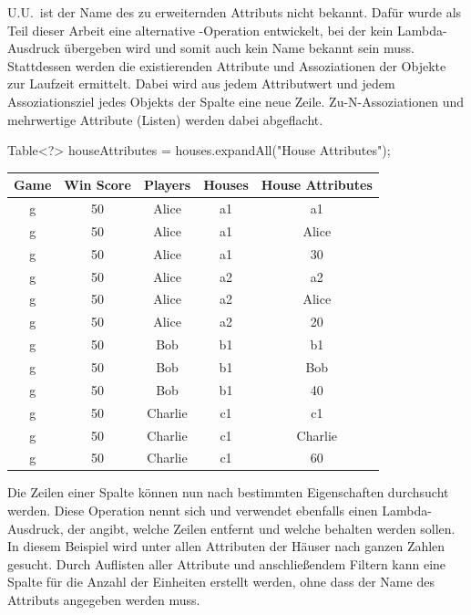 U.U.\ ist der Name des zu erweiternden Attributs nicht bekannt.
Dafür wurde als Teil dieser Arbeit eine alternative -Operation entwickelt,
bei der kein Lambda-Ausdruck übergeben wird und somit auch kein Name bekannt sein muss.
Stattdessen werden die existierenden Attribute und Assoziationen der Objekte zur Laufzeit ermittelt.
Dabei wird aus jedem Attributwert und jedem Assoziationsziel jedes Objekts der Spalte  eine neue Zeile.
Zu-N-Assoziationen und mehrwertige Attribute (Listen) werden dabei abgeflacht.

\begin{jcodeblock}
    Table<?> houseAttributes = houses.expandAll("House Attributes");
\end{jcodeblock}

\begin{tabular}{|c|c|c|c|c|}
    \hline
    \textbf{Game} & \textbf{Win Score} & \textbf{Players} & \textbf{Houses} & \textbf{House Attributes} \\
    \hline
    g & 50 & Alice   & a1 & a1      \\
    g & 50 & Alice   & a1 & Alice   \\
    g & 50 & Alice   & a1 & 30      \\
    g & 50 & Alice   & a2 & a2      \\
    g & 50 & Alice   & a2 & Alice   \\
    g & 50 & Alice   & a2 & 20      \\
    g & 50 & Bob     & b1 & b1      \\
    g & 50 & Bob     & b1 & Bob     \\
    g & 50 & Bob     & b1 & 40      \\
    g & 50 & Charlie & c1 & c1      \\
    g & 50 & Charlie & c1 & Charlie \\
    g & 50 & Charlie & c1 & 60      \\
    \hline
\end{tabular}

Die Zeilen einer Spalte können nun nach bestimmten Eigenschaften durchsucht werden.
Diese Operation nennt sich  und verwendet ebenfalls einen Lambda-Ausdruck,
der angibt, welche Zeilen entfernt und welche behalten werden sollen.
In diesem Beispiel wird unter allen Attributen der Häuser nach ganzen Zahlen gesucht.
Durch Auflisten aller Attribute und anschließendem Filtern kann eine Spalte für die Anzahl der Einheiten erstellt werden, ohne dass der Name des Attributs angegeben werden muss.

